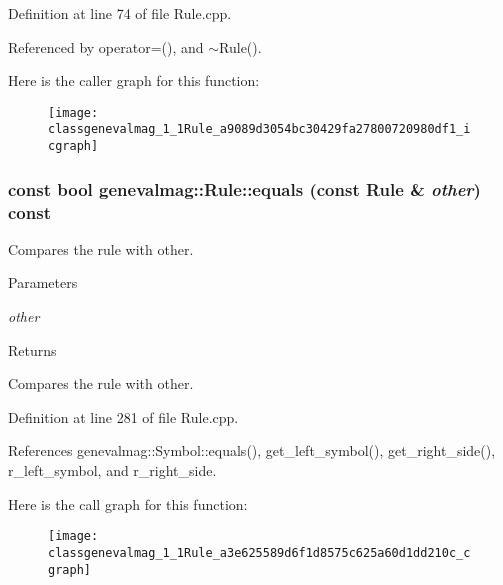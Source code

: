 Definition at line 74 of file Rule.cpp.



Referenced by operator=(), and $\sim$Rule().



Here is the caller graph for this function:\nopagebreak
\begin{figure}[H]
\begin{center}
\leavevmode
\texttt{[image: classgenevalmag\_1\_1Rule\_a9089d3054bc30429fa27800720980df1\_icgraph]}
\end{center}
\end{figure}


\hypertarget{classgenevalmag_1_1Rule_a3e625589d6f1d8575c625a60d1dd210c}{
\subsubsection[{equals}]{\setlength{\rightskip}{0pt plus 5cm}const bool genevalmag::Rule::equals (const {\bf Rule} \& {\em other}) const}}
\label{classgenevalmag_1_1Rule_a3e625589d6f1d8575c625a60d1dd210c}
Compares the rule with other. 
\begin{DoxyParams}{Parameters}
\item[{\em other}]\end{DoxyParams}
\begin{DoxyReturn}{Returns}

\end{DoxyReturn}
Compares the rule with other. 

Definition at line 281 of file Rule.cpp.



References genevalmag::Symbol::equals(), get\_\-left\_\-symbol(), get\_\-right\_\-side(), r\_\-left\_\-symbol, and r\_\-right\_\-side.



Here is the call graph for this function:\nopagebreak
\begin{figure}[H]
\begin{center}
\leavevmode
\texttt{[image: classgenevalmag\_1\_1Rule\_a3e625589d6f1d8575c625a60d1dd210c\_cgraph]}
\end{center}
\end{figure}


